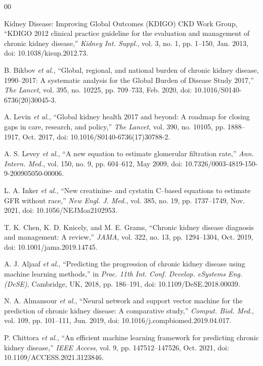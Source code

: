 \documentclass[conference]{IEEEtran}
\begin{document}
\begin{thebibliography}{00}

Kidney Disease: Improving Global Outcomes (KDIGO) CKD Work Group, ``KDIGO 2012 clinical practice guideline for the evaluation and management of chronic kidney disease,'' \emph{Kidney Int. Suppl.}, vol. 3, no. 1, pp. 1--150, Jan. 2013, doi: 10.1038/kisup.2012.73.

B. Bikbov \emph{et al.}, ``Global, regional, and national burden of chronic kidney disease, 1990--2017: A systematic analysis for the Global Burden of Disease Study 2017,'' \emph{The Lancet}, vol. 395, no. 10225, pp. 709--733, Feb. 2020, doi: 10.1016/S0140-6736(20)30045-3.

A. Levin \emph{et al.}, ``Global kidney health 2017 and beyond: A roadmap for closing gaps in care, research, and policy,'' \emph{The Lancet}, vol. 390, no. 10105, pp. 1888--1917, Oct. 2017, doi: 10.1016/S0140-6736(17)30788-2.

A. S. Levey \emph{et al.}, ``A new equation to estimate glomerular filtration rate,'' \emph{Ann. Intern. Med.}, vol. 150, no. 9, pp. 604--612, May 2009, doi: 10.7326/0003-4819-150-9-200905050-00006.

L. A. Inker \emph{et al.}, ``New creatinine- and cystatin C--based equations to estimate GFR without race,'' \emph{New Engl. J. Med.}, vol. 385, no. 19, pp. 1737--1749, Nov. 2021, doi: 10.1056/NEJMoa2102953.

T. K. Chen, K. D. Knicely, and M. E. Grams, ``Chronic kidney disease diagnosis and management: A review,'' \emph{JAMA}, vol. 322, no. 13, pp. 1294--1304, Oct. 2019, doi: 10.1001/jama.2019.14745.

A. J. Aljaaf \emph{et al.}, ``Predicting the progression of chronic kidney disease using machine learning methods,'' in \emph{Proc. 11th Int. Conf. Develop. eSystems Eng. (DeSE)}, Cambridge, UK, 2018, pp. 186--191, doi: 10.1109/DeSE.2018.00039.

N. A. Almansour \emph{et al.}, ``Neural network and support vector machine for the prediction of chronic kidney disease: A comparative study,'' \emph{Comput. Biol. Med.}, vol. 109, pp. 101--111, Jun. 2019, doi: 10.1016/j.compbiomed.2019.04.017.

P. Chittora \emph{et al.}, ``An efficient machine learning framework for predicting chronic kidney disease,'' \emph{IEEE Access}, vol. 9, pp. 147512--147526, Oct. 2021, doi: 10.1109/ACCESS.2021.3123846.


\end{thebibliography}
\end{document}
